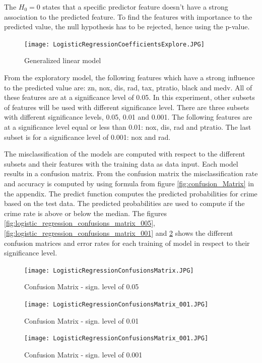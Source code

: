 The $H_0 = 0$  states that a specific predictor feature doesn't have a strong association to the predicted feature. To find the features with importance to the predicted value, the null hypothesis has to be rejected, hence using the p-value.    


\begin{figure}[H]
\centering
\texttt{[image: LogisticRegressionCoefficientsExplore.JPG]}
\caption{Generalized linear model}
\label{fig:generalized_linear_model}
\end{figure}

From the exploratory model, the following features which have a strong influence to the predicted value are: zn, nox, dis, rad, tax, ptratio, black and medv. 
All of these features are at a significance level of 0.05. In this experiment, other subsets of features will be used with different significance level. There are three subsets with different significance levels, 0.05, 0.01 and 0.001. The following features are at a significance level equal or less than 0.01: nox, dis, rad and ptratio. The last subset is for a significance level of 0.001: nox and rad.  

The misclassification of the models are computed with respect to the different subsets and their features with the training data as data input. Each model results in a confusion matrix. From the confusion matrix the misclassification rate and accuracy is computed by using formula from figure \ref{fig:confusion_Matrix} in the appendix. The predict function computes the predicted probabilities for crime based on the test data. The predicted probabilities are used to compute if the crime rate is above or below the median. The figures \ref{fig:logistic_regression_confusions_matrix_005}, \ref{fig:logistic_regression_confusions_matrix_001} and \ref{fig:logistic_regression_confusions_matrix_0001} shows the different confusion matrices and error rates for each training of model in respect to their significance level.  \\

\begin{figure}[h]
\centering
\begin{minipage}{0.32\textwidth}
\centering
    \texttt{[image: LogisticRegressionConfusionsMatrix.JPG]}
    \caption{Confusion Matrix - sign. level of 0.05}
    \label{fig:logistic_regression_confusions_matrix_005}
\end{minipage}\hfill
\begin{minipage}{0.32\textwidth}
\centering

\texttt{[image: LogisticRegressionConfusionsMatrix\_001.JPG]}
    \caption{Confusion Matrix - sign. level of 0.01}
    \label{fig:logistic_regression_confusions_matrix_001}
\end{minipage}\hfill
\begin{minipage}{0.32\textwidth}
\centering

\texttt{[image: LogisticRegressionConfusionsMatrix\_001.JPG]}
    \caption{Confusion Matrix - sign. level of 0.001}
    \label{fig:logistic_regression_confusions_matrix_0001}
\end{minipage}
\end{figure}


